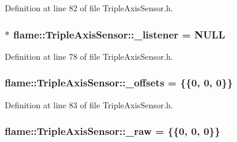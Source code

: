 Definition at line 82 of file Triple\-Axis\-Sensor.\-h.

\hypertarget{classflame_1_1_triple_axis_sensor_a13289e03729649c86021beaf5c5e0279}{
\subsubsection[{\-\_\-listener}]{$\ast$ flame\-::\-Triple\-Axis\-Sensor\-::\-\_\-listener = N\-U\-L\-L\hspace{0.3cm}{\ttfamily [protected]}}}\label{classflame_1_1_triple_axis_sensor_a13289e03729649c86021beaf5c5e0279}


Definition at line 78 of file Triple\-Axis\-Sensor.\-h.

\hypertarget{classflame_1_1_triple_axis_sensor_af4c80100c14de0069a584217136187af}{
\subsubsection[{\-\_\-offsets}]{ flame\-::\-Triple\-Axis\-Sensor\-::\-\_\-offsets = \{\{0, 0, 0\}\}\hspace{0.3cm}{\ttfamily [protected]}}}\label{classflame_1_1_triple_axis_sensor_af4c80100c14de0069a584217136187af}


Definition at line 83 of file Triple\-Axis\-Sensor.\-h.

\hypertarget{classflame_1_1_triple_axis_sensor_af87126ea5a6aeab421e4dec5799e58c9}{
\subsubsection[{\-\_\-raw}]{ flame\-::\-Triple\-Axis\-Sensor\-::\-\_\-raw = \{\{0, 0, 0\}\}\hspace{0.3cm}{\ttfamily [protected]}}}\label{classflame_1_1_triple_axis_sensor_af87126ea5a6aeab421e4dec5799e58c9}



